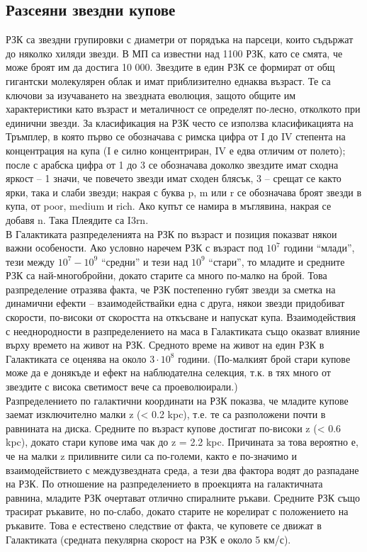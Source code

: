 \documentclass[a4paper,12pt]{article}
\begin{document}
\subsection{Разсеяни звездни купове}
РЗК са звездни групировки с диаметри от порядъка на парсеци, които съдържат до няколко хиляди звезди. В МП са известни над 1100 РЗК, като се смята, че може броят им да достига 10 000. Звездите в един РЗК се формират от общ гигантски молекулярен облак и имат приблизително еднаква възраст. Те са ключови за изучаването на звездната еволюция, защото
общите им характеристики като възраст и металичност се определят по-лесно, отколкото при единични звезди. За класификация на РЗК често се използва класификацията на Тръмплер, в която първо се обозначава с римска цифра от I до IV степента на концентрация на купа (I е силно концентриран, IV е едва отличим от полето); после с арабска цифра от 1 до 3 се обозначава
доколко звездите имат сходна яркост – 1 значи, че повечето звезди имат сходен блясък, 3 – срещат се както ярки, така и слаби звезди; накрая с буква p, m или r се обозначава броят звезди в купа, от poor, medium и rich. Ако купът се намира в мъглявина, накрая се добавя n. Така Плеядите са I3rn.\\

В Галактиката разпределенията на РЗК по възраст и позиция показват някои важни особености. Ако условно наречем РЗК с възраст под $10^7$ години “млади”, тези между $10^7 - 10^9$ “средни” и тези над $10^9$ “стари”, то младите и средните РЗК са най-многобройни, докато старите са много по-малко на брой. Това разпределение отразява факта, че РЗК постепенно губят звезди за сметка на динамични ефекти – взаимодействайки една с друга, някои звезди придобиват скорости, по-високи от скоростта на откъсване и напускат купа. Взаимодействия с нееднородности в разпределението на маса в Галактиката също оказват влияние върху времето на живот на РЗК. Средното време на живот на един РЗК в Галактиката се оценява на около $3 \cdot 10^8$ години. (По-малкият брой стари купове може да е донякъде и ефект на наблюдателна селекция, т.к. в тях много от звездите с висока светимост вече са проеволюирали.)\\

Разпределението по галактични координати на РЗК показва, че младите купове заемат изключително малки z (< 0.2 kpc), т.е. те са разположени почти в равнината на диска. Средните по възраст купове достигат по-високи z (< 0.6 kpc), докато стари купове има чак до z = 2.2 kpc. Причината за това вероятно е, че на малки z приливните сили са по-големи, както е по-значимо и взаимодействието с междузвездната среда, а тези два фактора водят до разпадане на РЗК. По отношение на разпределението в проекцията на галактичната равнина, младите РЗК очертават отлично спиралните ръкави. Средните РЗК също трасират ръкавите, но по-слабо, докато старите не корелират с положението на ръкавите. Това е естествено следствие от факта, че куповете се движат в Галактиката (средната пекулярна скорост на РЗК е около 5 км/с).\\
\end{document}
